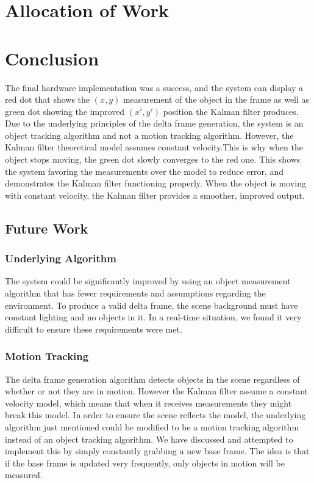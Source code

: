 \documentclass[11pt]{article} %
\begin{document}
\section{Allocation of Work}
\section{Conclusion}
The final hardware implementation was a success, and the system can display a red dot that shows the $(x,y)$ measurement of the object in the frame as well as green dot showing the improved $(x',y')$ position the Kalman filter produces. Due to the underlying principles of the delta frame generation, the system is an object tracking algorithm and not a motion tracking algorithm. However, the Kalman filter theoretical model assumes constant velocity.This is why when the object stops moving, the green dot slowly converges to the red one. This shows the system favoring the measurements over the model to reduce error, and demonstrates the Kalman filter functioning properly. When the object is moving with constant velocity, the Kalman filter provides a smoother, improved output.
\subsection{Future Work}
\subsubsection{Underlying Algorithm}
The system could be significantly improved by using an object measurement algorithm that has fewer requirements and assumptions regarding the environment. To produce a valid delta frame, the scene background must have constant lighting and no objects in it. In a real-time situation, we found it very difficult to ensure these requirements were met. 
\subsubsection{Motion Tracking}
The delta frame generation algorithm detects objects in the scene regardless of whether or not they are in motion. However the Kalman filter assume a constant velocity model, which means that when it receives measurements they might break this model. In order to ensure the scene reflects the model, the underlying algorithm just mentioned could be modified to be a motion tracking algorithm instead of an object tracking algorithm. We have discussed and attempted to implement this by simply constantly grabbing a new base frame. The idea is that if the base frame is updated very frequently, only objects in motion will be measured.
\end{document}
